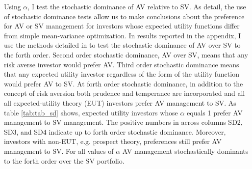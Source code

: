 Using $\alpha$, I test the stochastic dominance of AV relative to SV. As \citet{hadar_rules_1969,hanoch_efficiency_1969,rothschild_increasing_1970,levy_experimental_2002} detail, the use of stochastic dominance tests allow us to make conclusions about the preference for AV or SV management for investors whose expected utility functions differ from simple mean-variance optimization. In results reported in the appendix, I use the methods detailed in \citet{vinod_h.d._ranking_2004,vinod_hands-intermediate_2008} to test the stochastic dominance of AV over SV to the forth order. Second order stochastic dominance, AV over SV, means that any risk averse investor would prefer AV. \citep{mcfadden_testing_1989,valle_novel_2017} Third order stochastic dominance means that any expected utility investor regardless of the form of the utility function would prefer AV to SV. \citep{whitmore_third-degree_1970,chan_third_2016} At forth order stochastic dominance, in addition to the concept of risk aversion both prudence and temperance are incorporated and all all expected-utility theory (EUT) investors prefer AV management to SV. \citep{kimball_standard_1993,noauthor_risk-aversion_nodate} As table \ref{tab:tab_sd} shows, expected utility investors whose $\alpha$ equals 1 prefer AV management to SV management. The positive numbers in across columns SD2, SD3, and SD4 indicate up to forth order stochastic dominance. Moreover, investors with non-EUT, e.g. prospect theory, preferences still prefer AV management to SV. \citep{kahneman_prospect_1979} For all values of $\alpha$ AV management stochastically dominants to the forth order over the SV portfolio.


